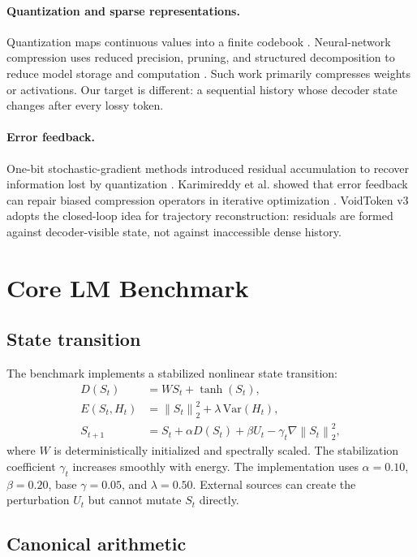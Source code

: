 \documentclass[10pt]{article}
\newcommand{\norm}[1]{\left\lVert #1 \right\rVert_2}
\begin{document}
\paragraph{Quantization and sparse representations.}
Quantization maps continuous values into a finite codebook
\cite{gray1998}. Neural-network compression uses reduced precision, pruning,
and structured decomposition to reduce model storage and computation
\cite{han2016,he2016}. Such work primarily compresses weights or activations.
Our target is different: a sequential history whose decoder state changes after
every lossy token.

\paragraph{Error feedback.}
One-bit stochastic-gradient methods introduced residual accumulation to recover
information lost by quantization \cite{seide2014}. Karimireddy et al. showed
that error feedback can repair biased compression operators in iterative
optimization \cite{karimireddy2019}. VoidToken v3 adopts the closed-loop idea
for trajectory reconstruction: residuals are formed against decoder-visible
state, not against inaccessible dense history.

\section{Core LM Benchmark}

\subsection{State transition}

The benchmark implements a stabilized nonlinear state transition:
\begin{align}
  D(S_t) &= WS_t+\tanh(S_t),\\
  E(S_t,H_t) &= \norm{S_t}^2+\lambda\,\mathrm{Var}(H_t),\\
  S_{t+1} &= S_t+\alpha D(S_t)+\beta U_t
             -\gamma_t\nabla\norm{S_t}^2,
  \label{eq:core}
\end{align}
where $W$ is deterministically initialized and spectrally scaled. The
stabilization coefficient $\gamma_t$ increases smoothly with energy. The
implementation uses $\alpha=0.10$, $\beta=0.20$, base $\gamma=0.05$, and
$\lambda=0.50$. External sources can create the perturbation $U_t$ but cannot
mutate $S_t$ directly.

\subsection{Canonical arithmetic}
\end{document}

